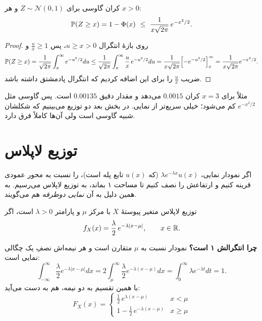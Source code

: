 \begin{proposition}[label=prop:gauss-tail]{کران  گاوسی}
برای $Z\sim\mathcal N(0,1)$ و هر $x>0$:
\[ \P(Z\ge x)=1-\Phi(x)\ \le\ \frac{1}{x\sqrt{2\pi}}\,e^{-x^2/2}. \]
\end{proposition}

\begin{proof}
روی بازهٔ انتگرال $u\ge x>0$، پس $\frac ux\ge1$ و
\[ \P(Z\ge x)=\frac{1}{\sqrt{2\pi}}\int_x^\infty e^{-u^2/2}du\le\frac{1}{\sqrt{2\pi}}\int_x^\infty\frac ux\,e^{-u^2/2}du=\frac{1}{x\sqrt{2\pi}}\Bigl[-e^{-u^2/2}\Bigr]_x^\infty=\frac{1}{x\sqrt{2\pi}}e^{-x^2/2}. \]
ضریب $\frac ux$ را برای این اضافه کردیم که انتگرال پادمشتق داشته باشد.
\end{proof}

مثلاً برای $x=3$ کران $0.0015$ می‌دهد و مقدار دقیق $0.00135$ است. پس  گاوسی مثل $e^{-x^2/2}$ کم می‌شود؛ خیلی سریع‌تر از  نمایی. در بخش بعد دو توزیع می‌بینیم که شکلشان شبیه گاوسی است ولی  آن‌ها کاملاً فرق دارد.

\section{توزیع لاپلاس}
\label{sec:laplace}

اگر نمودار نمایی، $\lambda e^{-\lambda x}u(x)$ (که $u(x)$ تابع پله است)، را نسبت به محور عمودی قرینه کنیم و ارتفاعش را نصف کنیم تا مساحت ۱ بماند، به توزیع لاپلاس می‌رسیم. به همین دلیل به آن \emph{نمایی دوطرفه} هم می‌گویند.

\begin{definition}[label=def:laplace]{توزیع لاپلاس}
متغیر پیوستهٔ $X$  با مرکز $\mu$ و پارامتر $\lambda>0$ است، اگر
\[ f_X(x)=\frac{\lambda}{2}\,e^{-\lambda|x-\mu|},\qquad x\in\R. \]
\end{definition}

\textbf{چرا انتگرالش ۱ است؟} نمودار نسبت به $\mu$ متقارن است و هر نیمه‌اش نصفِ یک چگالی نمایی است:
\[ \int_{-\infty}^{\infty}\frac\lambda2e^{-\lambda|x-\mu|}dx=2\int_{\mu}^{\infty}\frac\lambda2e^{-\lambda(x-\mu)}dx=\int_0^\infty\lambda e^{-\lambda t}dt=1. \]
با همین تقسیم به دو نیمه،  هم به دست می‌آید:
\[ F_X(x)=\begin{cases}\tfrac12\,e^{\lambda(x-\mu)} & x<\mu\\[3pt] 1-\tfrac12\,e^{-\lambda(x-\mu)} & x\ge\mu\end{cases} \]

